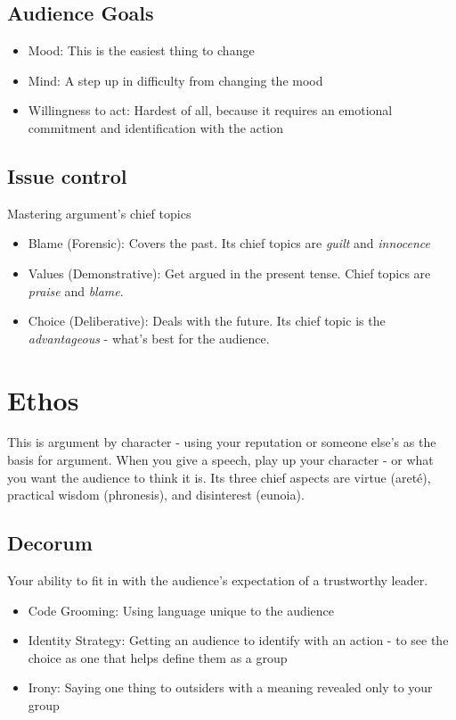 \subsection{Audience Goals}
\begin{itemize}
	\item Mood: This is the easiest thing to change
	\item Mind: A step up in difficulty from changing the mood
	\item Willingness to act: Hardest of all, because it requires an emotional commitment and identification with the action 
\end{itemize}

\subsection{Issue control} 
Mastering argument's chief topics
\begin{itemize}
	\item Blame (Forensic): Covers the past. Its chief topics are \emph{guilt} and \emph{innocence}
	\item Values (Demonstrative): Get argued in the present tense. Chief topics are \emph{praise} and \emph{blame}.
	\item Choice (Deliberative): Deals with the future. Its chief topic is the \emph{advantageous} - what's best for the audience.
\end{itemize}

\section{Ethos}
This is argument by character - using your reputation or someone else's as the basis for argument. When you give a speech, play up your character - or what you want the audience to think it is. Its three chief aspects are virtue (areté), practical wisdom (phronesis), and disinterest (eunoia).\\

\subsection{Decorum}
Your ability to fit in with the audience's expectation of a trustworthy leader.
\begin{itemize}
	\item Code Grooming: Using language unique to the audience
	\item Identity Strategy: Getting an audience to identify with an action - to see the choice as one that helps define them as a group
	\item Irony: Saying one thing to outsiders with a meaning revealed only to your group
\end{itemize}


